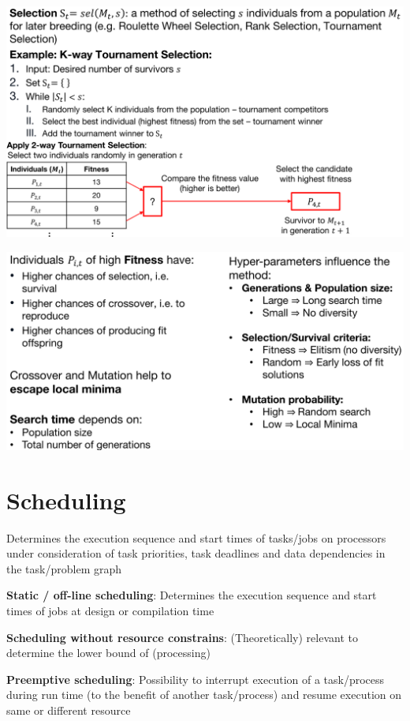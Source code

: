 \documentclass[english]{latex4ei/latex4ei_sheet}
\begin{document}
\begin{center}
  \centering
  \includegraphics[width=0.8\linewidth]{assets/GeneticSelection.png}
  \label{fig:geneticselection}
\end{center}

\begin{center}
  \centering
  \includegraphics[width=0.8\linewidth]{assets/GeneticCharacteristics.png}
  \label{fig:geneticcharacteristics}
\end{center}

\section{Scheduling}
Determines the execution sequence and start times of tasks/jobs on processors under consideration of task priorities, task deadlines and data dependencies in the task/problem graph

\textbf{Static / off-line scheduling}: Determines the execution sequence and
start times of jobs at design or compilation time

\textbf{Scheduling without resource constrains}: (Theoretically) relevant to determine the lower bound of (processing)

\textbf{Preemptive scheduling}: Possibility to interrupt execution of a
task/process during run time (to the benefit of another task/process) and
resume execution on same or different resource
\end{document}
